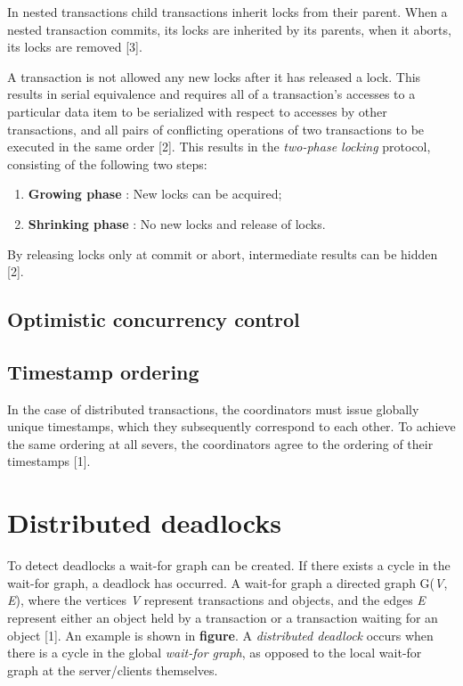 In nested transactions child transactions inherit locks from their parent. When a nested transaction commits, its locks are inherited by its parents, when it aborts, its locks are removed [3].

A transaction is not allowed any new locks after it has released a lock. This results in serial equivalence and requires all of a transaction's accesses to a particular data item to be serialized with respect to accesses by other transactions, and all pairs of conflicting operations of two transactions to be executed in the same order [2]. This results in the \emph{two-phase locking} protocol, consisting of the following two steps:
\begin{enumerate}
	\item \textbf{Growing phase} : New locks can be acquired;
	\item \textbf{Shrinking phase} : No new locks and release of locks.
\end{enumerate}
By releasing locks only at commit or abort, intermediate results can be hidden [2].




\subsection{Optimistic concurrency control}

\subsection{Timestamp ordering}

In the case of distributed transactions, the coordinators must issue globally unique timestamps, which they subsequently correspond to each other. To achieve the same ordering at all severs, the coordinators agree to the ordering of their timestamps [1].




\section{Distributed deadlocks}

To detect deadlocks a wait-for graph can be created. If there exists a cycle in the wait-for graph, a deadlock has occurred. A wait-for graph a directed graph G(\textit{V}, \textit{E}), where the vertices \textit{V} represent transactions and objects, and the edges \textit{E} represent either an object held by a transaction or a transaction waiting for an object [1]. An example is shown in \textbf{figure}. A \emph{distributed deadlock} occurs when there is a cycle in the global \emph{wait-for graph}, as opposed to the local wait-for graph at the server/clients themselves.

